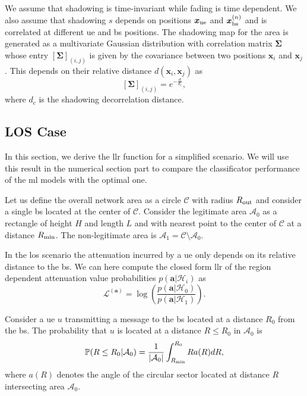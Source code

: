 \documentclass[twocolumns]{IEEEtran}
\begin{document}
We assume that shadowing is time-invariant while fading is time dependent. We also assume that shadowing $s$ depends on positions $\bm{x}_{\rm ue}$ and $\bm{x}_{\rm bs}^{(n)}$ and is correlated at different \ac{ue} and \ac{bs} positions. The shadowing map for the area is generated as a multivariate Gaussian distribution with correlation matrix $\bm{\Sigma}$ whose entry $\left[\bm{\Sigma}\right]_{(i,j)}$ is given by the covariance between two positions $\bm{x}_i$ and $\bm{x}_j$. This depends on their relative distance $d(\bm{x}_i,\bm{x}_j)$ as
\begin{equation}\label{eq: coor mat}
    \left[\bm{\Sigma}\right]_{(i,j)} = e^{-\frac{d}{d_c}},
\end{equation}
where $d_c$ is the shadowing decorrelation distance. 

\subsection{LOS Case}

In this section, we derive the \ac{llr} function for a simplified scenario. We will use this result in the numerical section part to compare the classificator performance of the \ac{ml} models with the optimal one.

Let us define the overall network area as a circle $\mathcal{C}$ with radius $R_{\rm out}$ and consider a single \ac{bs} located at the center of $\mathcal{C}$. Consider the legitimate area $\mathcal{A}_{0}$ as a rectangle of height $H$ and length $L$ and with nearest point to the center of $\mathcal{C}$ at a distance $R_{\rm min}$. The non-legitimate area is $\mathcal{A}_1 = \mathcal{C} \setminus \mathcal{A}_0$.

In the \ac{los} scenario the attenuation incurred by a \ac{ue} only depends on its relative distance to the \ac{bs}. We can here compute the closed form \ac{llr} of the region dependent attenuation value probabilities $p(\bm{a}|\mathcal{H}_i)$ as
\begin{equation}\label{eq:lr}
    \mathcal{L}^{(\bm{a})}=\log\left(\frac{p(\bm{a}|\mathcal{H}_0)}{p(\bm{a}|\mathcal{H}_1)}\right).
\end{equation}

Consider a \ac{ue} $u$ transmitting a message to the \ac{bs} located at a distance $R_0$ from the \ac{bs}. The probability that $u$ is located at a distance $R\le R_0$ in $\mathcal{A}_0$ is
\begin{equation}\label{eq:cdf}
     \mathbb{P}(R \le R_0|\mathcal{A}_0) = \frac{1}{|\mathcal{A}_0|}\int_{R_{\rm min}}^{R_0} R a(R) dR,
\end{equation}
where $a(R)$ denotes the angle of the circular sector located at distance $R$ intersecting area $\mathcal{A}_0$.
\end{document}

